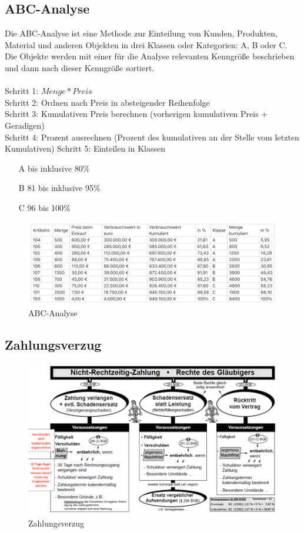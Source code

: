 \documentclass[10pt]{article}
\begin{document}
\subsection{ABC-Analyse}

Die ABC-Analyse ist eine Methode zur Einteilung von Kunden, Produkten, Material und anderen Objekten in drei Klassen oder Kategorien: A, B oder C. \\
Die Objekte werden mit einer für die Analyse relevanten Kenngröße beschrieben und dann nach dieser Kenngröße sortiert. \\ \\
Schritt 1: $Menge * Preis$ \\
Schritt 2: Ordnen nach Preis in absteigender Reihenfolge \\
Schritt 3: Kumulativen Preis berechnen (vorherigen kumulativen Preis + Geradigen) \\
Schritt 4: Prozent ausrechnen (Prozent des kumulativen an der Stelle vom letzten \\ Kumulativen)
Schritt 5: Einteilen in Klassen
\begin{itemize}
\item[A] bis inklusive 80\%
\item[B] 81 bis inklusive 95\%
\item[C] 96 bis 100\%
\end{itemize}
\begin{figure}[H]
\begin{center}
  \includegraphics[width=12cm]{ABC.png}
  \end{center}
  \caption{ABC-Analyse}
\end{figure}

\subsection{Zahlungsverzug}
\begin{figure}[H]
\begin{center}
  \includegraphics[width=12cm]{zahlungsverzug.png}
  \end{center}
  \caption{Zahlungsverzug}
  
\end{figure}
\end{document}
